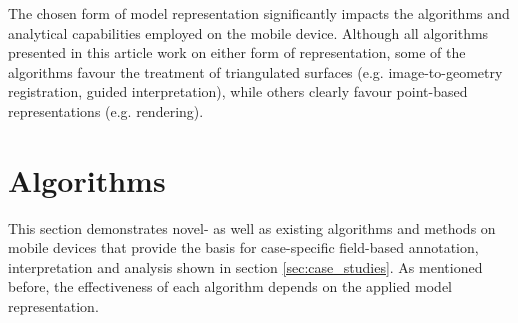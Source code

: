 \documentclass[review]{elsarticle}
\begin{document}
The chosen form of model representation significantly impacts the algorithms and analytical capabilities employed on the mobile device. Although all algorithms presented in this article work on either form of representation, some of the algorithms favour the treatment of triangulated surfaces (e.g. image-to-geometry registration, guided interpretation), while others clearly favour point-based representations (e.g. rendering).

\section{Algorithms}
\label{sec:algorithms}

This section demonstrates novel- as well as existing algorithms and methods on mobile devices that provide the basis for case-specific field-based annotation, interpretation and analysis shown in section \ref{sec:case_studies}. As mentioned before, the effectiveness of each algorithm depends on the applied model representation.

%

\end{document}
